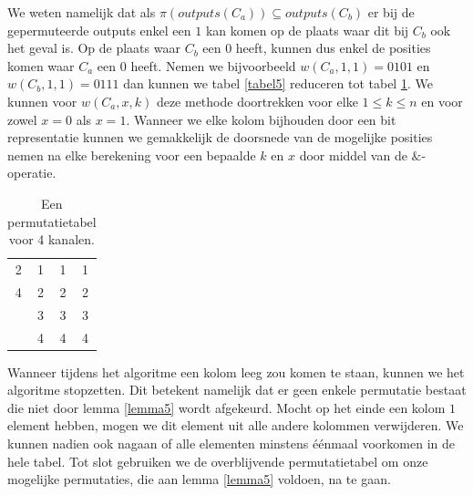 \documentclass{article}
\begin{document}
We weten namelijk dat als ${\pi\left(outputs\left(C_a\right)\right) \subseteq outputs\left(C_b\right)}$ er bij de gepermuteerde outputs enkel een $1$ kan komen op de plaats waar dit bij $C_b$ ook het geval is.
Op de plaats waar $C_b$ een $0$ heeft, kunnen dus enkel de posities komen waar $C_a$ een $0$ heeft.
Nemen we bijvoorbeeld $w\left(C_a,1,1\right) = 0101$ en ${w\left(C_b,1,1\right)=0111}$ dan kunnen we tabel \ref{tabel5} reduceren tot tabel \ref{tabel6}.
We kunnen voor $w\left(C_a, x, k\right)$ deze methode doortrekken voor elke $1 \leq k \leq n$ en voor zowel $x = 0$ als $x = 1$.
Wanneer we elke kolom bijhouden door een bit representatie kunnen we gemakkelijk de doorsnede van de mogelijke posities nemen na elke berekening voor een bepaalde $k$ en $x$ door middel van de $\&$-operatie. 
\begin{table}[!h]
	\centering
	\begin{tabular}{|c|c|c|c|}
	\hline
	2 & 1 & 1 & 1 \\ 
	4 & 2 & 2 & 2\\ 
	 & 3 & 3 & 3 \\
	 & 4 & 4 & 4\\ 
	\hline 
	\end{tabular}
	\caption{Een permutatietabel voor 4 kanalen.}
	\label{tabel6}
\end{table}

Wanneer tijdens het algoritme een kolom leeg zou komen te staan, kunnen we het algoritme stopzetten.
Dit betekent namelijk dat er geen enkele permutatie bestaat die niet door lemma \ref{lemma5} wordt afgekeurd.
Mocht op het einde een kolom $1$ element hebben, mogen we dit element uit alle andere kolommen verwijderen.
We kunnen nadien ook nagaan of alle elementen minstens \'e\'enmaal voorkomen in de hele tabel.
Tot slot gebruiken we de overblijvende permutatietabel om onze mogelijke permutaties, die aan lemma \ref{lemma5} voldoen, na te gaan. 
\end{document}
